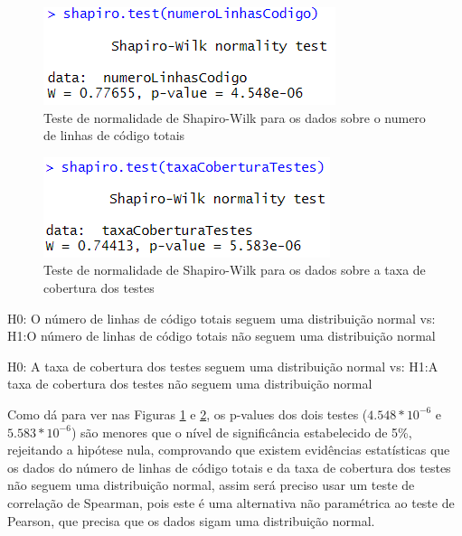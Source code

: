 \documentclass[%
 aip,
cp,  %
 amsmath,amssymb,%
 reprint,%
]{revtex4-2}
\begin{document}
\begin{figure}
    \centering
    \includegraphics[width=0.5\linewidth]{imagens//questao2/shapiroTestLinhasDeCodigoParaCorrelacao.png}
    \caption{Teste de normalidade de Shapiro-Wilk para os dados sobre o numero de linhas de código totais}
    \label{fig:ShairoTestLinhasParaCorrelacao}
\end{figure}
\begin{figure}
    \centering
    \includegraphics[width=0.5\linewidth]{imagens//questao2/ShapiroTestTaxaCoberturaParaCorrelacao.png}
    \caption{Teste de normalidade de Shapiro-Wilk para os dados sobre a taxa de cobertura dos testes}
    \label{fig:ShairoTestTaxaCoverturaParaCorrelacao}
\end{figure}

\begin{center}
    H0: O número de linhas de código totais seguem uma distribuição normal
    \newline
    vs:
    \newline
    H1:O número de linhas de código totais não seguem uma distribuição normal
    \newline
\end{center}


\begin{center}
    H0: A taxa de cobertura dos testes seguem uma distribuição normal
    \newline
    vs:
    \newline
    H1:A taxa de cobertura dos testes não seguem uma distribuição normal
    \newline
\end{center}

Como dá para ver nas Figuras \ref{fig:ShairoTestLinhasParaCorrelacao} e \ref{fig:ShairoTestTaxaCoverturaParaCorrelacao}, os p-values dos dois testes ($4.548 * 10^{-6}$ e $5.583 * 10^{-6}$) são menores que o nível de significância estabelecido de 5\%, rejeitando a hipótese nula, comprovando que existem evidências estatísticas que os dados do número de linhas de código totais e da taxa de cobertura dos testes não seguem uma distribuição normal, assim será preciso usar um teste de correlação de Spearman, pois este é uma alternativa não paramétrica ao teste de Pearson, que precisa que os dados sigam uma distribuição normal.
\end{document}
